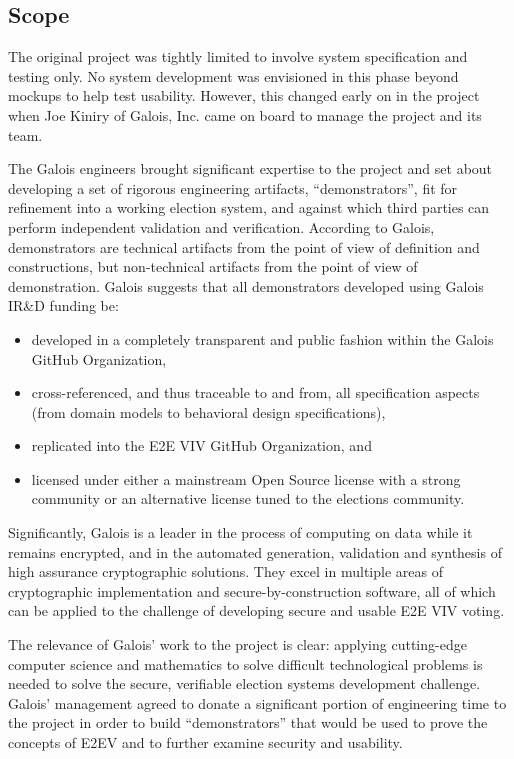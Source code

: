 \subsection{Scope}
\label{sec:scope}

The original project was tightly limited to involve system
specification and testing only. No system development was envisioned
in this phase beyond mockups to help test usability. However, this
changed early on in the project when Joe Kiniry of Galois, Inc. came
on board to manage the project and its team.

The Galois engineers brought significant expertise to the project and
set about developing a set of rigorous engineering artifacts,
``demonstrators'', fit for refinement into a working election system,
and against which third parties can perform independent validation and
verification. According to Galois, demonstrators are technical
artifacts from the point of view of definition and constructions, but
non-technical artifacts from the point of view of
demonstration. Galois suggests that all demonstrators developed using
Galois IR\&D funding be:
\begin{itemize}
\item developed in a completely transparent and public fashion within
  the Galois GitHub Organization,
\item cross-referenced, and thus traceable to and from, all
  specification aspects (from domain models to behavioral design
  specifications),
\item replicated into the E2E VIV GitHub Organization, and
\item licensed under either a mainstream Open Source license with a
  strong community or an alternative license tuned to the elections
  community.
\end{itemize}

Significantly, Galois is a leader in the process of computing on data
while it remains encrypted, and in the automated generation,
validation and synthesis of high assurance cryptographic
solutions. They excel in multiple areas of cryptographic
implementation and secure-by-construction software, all of which can
be applied to the challenge of developing secure and usable E2E VIV
voting.

The relevance of Galois’ work to the project is clear: applying
cutting-edge computer science and mathematics to solve difficult
technological problems is needed to solve the secure, verifiable
election systems development challenge. Galois’ management agreed to
donate a significant portion of engineering time to the project in
order to build “demonstrators” that would be used to prove the
concepts of E2EV and to further examine security and usability.

